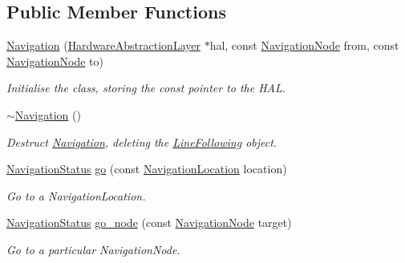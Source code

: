 \subsection*{Public Member Functions}
\begin{DoxyCompactItemize}
\item 
\hyperlink{classIDP_1_1Navigation_afc2747e51acc44614f67cb0a785f76ac}{Navigation} (\hyperlink{classIDP_1_1HardwareAbstractionLayer}{HardwareAbstractionLayer} $\ast$hal, const \hyperlink{namespaceIDP_a286f26dda01010063dff761803b4cd16}{NavigationNode} from, const \hyperlink{namespaceIDP_a286f26dda01010063dff761803b4cd16}{NavigationNode} to)
\begin{DoxyCompactList}\small\item\em Initialise the class, storing the const pointer to the HAL. \item\end{DoxyCompactList}\item 
\hyperlink{classIDP_1_1Navigation_a2af5390d05f2058beb841030f9aea0c0}{$\sim$Navigation} ()
\begin{DoxyCompactList}\small\item\em Destruct \hyperlink{classIDP_1_1Navigation}{Navigation}, deleting the \hyperlink{classIDP_1_1LineFollowing}{LineFollowing} object. \item\end{DoxyCompactList}\item 
\hyperlink{namespaceIDP_a1a96e566e4d675fdf20780cc96d92283}{NavigationStatus} \hyperlink{classIDP_1_1Navigation_aba1ab266d223b517fdc3cf6bc3d8e84c}{go} (const \hyperlink{namespaceIDP_ab9c412f0fd539b5d70385066c30465a0}{NavigationLocation} location)
\begin{DoxyCompactList}\small\item\em Go to a NavigationLocation. \item\end{DoxyCompactList}\item 
\hyperlink{namespaceIDP_a1a96e566e4d675fdf20780cc96d92283}{NavigationStatus} \hyperlink{classIDP_1_1Navigation_a24b977f20868a385251d4becf187b815}{go\_\-node} (const \hyperlink{namespaceIDP_a286f26dda01010063dff761803b4cd16}{NavigationNode} target)
\begin{DoxyCompactList}\small\item\em Go to a particular NavigationNode. \item\end{DoxyCompactList}\end{DoxyCompactItemize}
